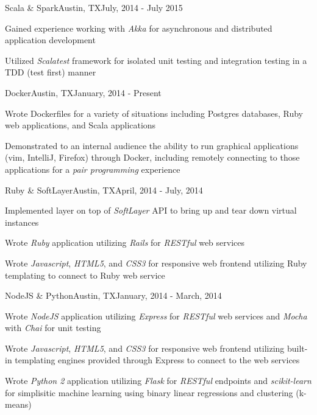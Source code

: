 \documentclass[10pt,a4paper]{article}
\begin{document}
{\begin{resumeinfo}{Scala \& Spark}{Austin, TX}{July, 2014 - July 2015}
        \item Gained experience working with \textit{Akka} for asynchronous
        and distributed application development

        \item Utilized \textit{Scalatest} framework for isolated unit testing
        and integration testing in a TDD (test first) manner
    \end{resumeinfo}
    \addvspace{1em}
    \begin{resumeinfo}{Docker}{Austin, TX}{January, 2014 - Present}
        \item Wrote Dockerfiles for a variety of situations including Postgres
        databases, Ruby web applications, and Scala applications

        \item Demonstrated to an internal audience the ability to run graphical
        applications (vim, IntelliJ, Firefox) through Docker, including 
        remotely connecting to those applications for a 
        \textit{pair programming} experience
    \end{resumeinfo}
    \addvspace{1em}
    \begin{resumeinfo}{Ruby \& SoftLayer}{Austin, TX}{April, 2014 - July, 2014}
        \item Implemented layer on top of \textit{SoftLayer} API to bring up
        and tear down virtual instances

        \item Wrote \textit{Ruby} application utilizing \textit{Rails} for
        \textit{RESTful} web services

        \item Wrote \textit{Javascript}, \textit{HTML5}, and \textit{CSS3} for
        responsive web frontend utilizing Ruby templating to connect to Ruby 
        web service
    \end{resumeinfo}
    \addvspace{1em}
    \begin{resumeinfo}{NodeJS \& Python}{Austin, TX}{January, 2014 - March, 2014}
        \item Wrote \textit{NodeJS} application utilizing \textit{Express} for 
        \textit{RESTful} web services and \textit{Mocha} with \textit{Chai}
        for unit testing

        \item Wrote \textit{Javascript}, \textit{HTML5}, and \textit{CSS3} for
        responsive web frontend utilizing built-in templating engines provided
        through Express to connect to the web services

        \item Wrote \textit{Python 2} application utilizing \textit{Flask} for
        \textit{RESTful} endpoints and \textit{scikit-learn} for simplisitic
        machine learning using binary linear regressions and clustering 
        (k-means)
    \end{resumeinfo}
}
    
\end{document}
